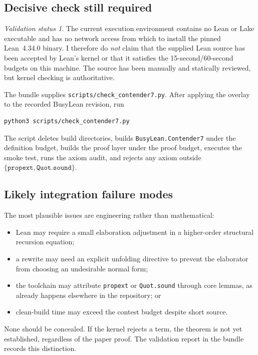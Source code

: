 \documentclass[11pt]{article}
\theoremstyle{definition}
\theoremstyle{remark}
\newtheorem{status}[theorem]{Validation status}
\newcommand{\lean}[1]{\texttt{#1}}
\newcommand{\codepath}[1]{\texttt{#1}}
\begin{document}
\subsection{Decisive check still required}

\begin{status}
The current execution environment contains no Lean or Lake executable and has
no network access from which to install the pinned Lean~4.34.0 binary.  I
therefore do \emph{not} claim that the supplied Lean source has been accepted by
Lean's kernel or that it satisfies the 15-second/60-second budgets on this
machine.  The source has been manually and statically reviewed, but kernel
checking is authoritative.
\end{status}

The bundle supplies \codepath{scripts/check\_contender7.py}.  After applying
the overlay to the recorded BusyLean revision, run
\begin{lstlisting}[language={}]
python3 scripts/check_contender7.py
\end{lstlisting}
The script deletes build directories, builds \lean{BusyLean.Contender7} under
the definition budget, builds the proof layer under the proof budget, executes
the smoke test, runs the axiom audit, and rejects any axiom outside
\(\{\lean{propext},\lean{Quot.sound}\}\).

\subsection{Likely integration failure modes}

The most plausible issues are engineering rather than mathematical:
\begin{itemize}[leftmargin=*]
  \item Lean may require a small elaboration adjustment in a higher-order
        structural recursion equation;
  \item a rewrite may need an explicit unfolding directive to prevent the
        elaborator from choosing an undesirable normal form;
  \item the toolchain may attribute \lean{propext} or \lean{Quot.sound} through
        core lemmas, as already happens elsewhere in the repository; or
  \item clean-build time may exceed the contest budget despite short source.
\end{itemize}
None should be concealed.  If the kernel rejects a term, the theorem is not yet
established, regardless of the paper proof.  The validation report in the
bundle records this distinction.
\end{document}
